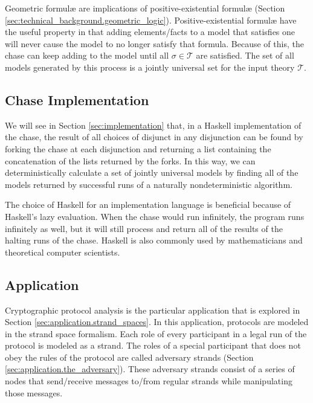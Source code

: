 		Geometric formul{\ae} are implications of positive-existential
		formul{\ae} (Section \ref{sec:technical_background.geometric_logic}).
		Positive-existential formul{\ae} have the useful property in that
		adding elements/facts to a model that satisfies one will never cause
		the model to no longer satisfy that formula. Because of this, the chase
		can keep adding to the model until all $\sigma \in \mathcal{T}$ are
		satisfied. The set of all models generated by this process is a jointly
		universal set for the input theory $\mathcal{T}$.

	\subsection{Chase Implementation}

		We will see in Section \ref{sec:implementation} that, in a Haskell
		implementation of the chase, the result of all choices of disjunct in
		any disjunction can be found by forking the chase at each disjunction
		and returning a list containing the concatenation of the lists returned
		by the forks. In this way, we can deterministically calculate a set of
		jointly universal models by finding all of the models returned by
		successful runs of a naturally nondeterministic algorithm.

		The choice of Haskell for an implementation language is beneficial
		because of Haskell's lazy evaluation. When the chase would run
		infinitely, the program runs infinitely as well, but it will still
		process and return all of the results of the halting runs of the chase.
		Haskell is also commonly used by mathematicians and theoretical
		computer scientists.

	\subsection{Application}

		Cryptographic protocol analysis is the particular application that is
		explored in Section \ref{sec:application.strand_spaces}. In this
		application, protocols are modeled in the strand space formalism. Each
		role of every participant in a legal run of the protocol is modeled as
		a strand. The roles of a special participant that does not obey the
		rules of the protocol are called adversary strands (Section
		\ref{sec:application.the_adversary}). These adversary strands consist
		of a series of nodes that send/receive messages to/from regular strands
		while manipulating those messages.

